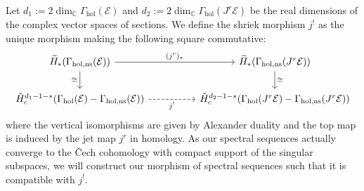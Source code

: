 \documentclass[a4paper]{amsart}
\newcommand{\bC}{\mathbb C}
\newcommand{\cE}{\mathcal E}
\theoremstyle{plain}
\theoremstyle{definition}
\newcommand{\CCH}{\check{H}_{c}}
\newcommand{\Gammahol}{\Gamma_{\mathrm{hol}}}
\begin{document}
Let $d_1 := 2\dim_\bC \Gammahol(\cE)$ and $d_2 := 2\dim_\bC \Gammahol(J^r\cE)$ be the real dimensions of the complex vector spaces of sections. We define the shriek morphism $j^!$ as the unique morphism making the following square commutative:
\begin{equation}\label{eqn:diagramdefshriekmapAlexanderduality}
\begin{tikzcd}
{\widetilde{H}_*(\Gamma_{\mathrm{hol,ns}}(\cE))} \arrow[d, "\cong"'] \arrow[rr, "(j^r)_*"]      &  & {\widetilde{H}_*(\Gamma_{\mathrm{hol,ns}}(J^r\cE))} \arrow[d, "\cong"]     \\
{\CCH^{d_1 - 1 - *}(\Gammahol(\cE) - \Gamma_{\mathrm{hol,ns}}(\cE))} \arrow[rr, "j^!"', dashed] &  & {\CCH^{d_2 - 1 - *}(\Gammahol(J^r\cE) - \Gamma_{\mathrm{hol,ns}}(J^r\cE))}
\end{tikzcd}
\end{equation}
where the vertical isomorphisms are given by Alexander duality and the top map is induced by the jet map $j^r$ in homology. As our spectral sequences actually converge to the \v{Cech} cohomology with compact support of the singular subspaces, we will construct our morphism of spectral sequences such that it is compatible with $j^!$. 

\bigskip
\end{document}
